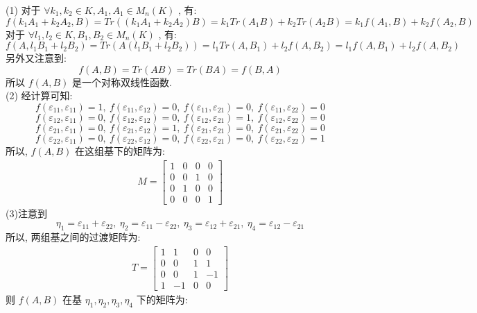 \documentclass[11pt,a4paper,openany,oneside]{book}
\begin{document}
(1) 对于 $ \forall k_1, k_2 \in K, A_1, A_1 \in M_n(K) $ , 有:
 $$  f(k_1A_1+k_2A_2, B) = Tr((k_1A_1+k_2A_2)B) =k_1Tr(A_1B) + k_2Tr(A_2B) = k_1f(A_1, B) + k_2f(A_2, B)  $$ 
对于 $ \forall l_1, l_2 \in K, B_1, B_2 \in M_n(K) $ , 有:
 $$  f(A, l_1B_1 + l_2B_2) = Tr(A(l_1B_1 + l_2B_2)) = l_1Tr(A, B_1) + l_2f(A, B_2) = l_1f(A, B_1) + l_2f(A, B_2)  $$ 
另外又注意到:
 $$  f(A,B) = Tr(AB) = Tr(BA) = f(B,A)  $$ 
所以 $ f(A,B) $ 是一个对称双线性函数. \\

(2) 经计算可知:
 $$  f(\varepsilon_{11}, \varepsilon_{11}) = 1, \ f(\varepsilon_{11}, \varepsilon_{12}) = 0, \ f(\varepsilon_{11}, \varepsilon_{21}) = 0, \ f(\varepsilon_{11}, \varepsilon_{22}) = 0  $$ 
 $$  f(\varepsilon_{12}, \varepsilon_{11}) = 0, \ f(\varepsilon_{12}, \varepsilon_{12}) = 0, \ f(\varepsilon_{12}, \varepsilon_{21}) = 1, \ f(\varepsilon_{12}, \varepsilon_{22}) = 0  $$ 
 $$  f(\varepsilon_{21}, \varepsilon_{11}) = 0, \ f(\varepsilon_{21}, \varepsilon_{12}) = 1, \ f(\varepsilon_{21}, \varepsilon_{21}) = 0, \ f(\varepsilon_{21}, \varepsilon_{22}) = 0  $$ 
 $$  f(\varepsilon_{22}, \varepsilon_{11}) = 0, \ f(\varepsilon_{22}, \varepsilon_{12}) = 0, \ f(\varepsilon_{22}, \varepsilon_{21}) = 0, \ f(\varepsilon_{22}, \varepsilon_{22}) = 1  $$ 
所以,  $ f(A,B) $ 在这组基下的矩阵为:
\begin{gather*}
M = 
\begin{bmatrix}
1  &  0  &  0  &  0  \\
0  &  0  &  1  &  0  \\
0  &  1  &  0  &  0  \\
0  &  0  &  0  &  1
\end{bmatrix}
\end{gather*}
(3)注意到
 $$  \eta_1 = \varepsilon_{11} + \varepsilon_{22}, \ \eta_2 = \varepsilon_{11} - \varepsilon_{22}, \ \eta_3 = \varepsilon_{12} + \varepsilon_{21}, \ \eta_4 = \varepsilon_{12} - \varepsilon_{21}  $$ 
所以, 两组基之间的过渡矩阵为:
\begin{gather*}
T = 
\begin{bmatrix}
1  &  1  &  0  &  0 \\
0  &  0  &  1  &  1  \\
0  &  0  &  1  & -1  \\
1  & -1  &  0  &  0
\end{bmatrix}
\end{gather*}
则 $ f(A,B) $ 在基 $ \eta_1, \eta_2, \eta_3, \eta_4 $ 下的矩阵为:
\end{document}
